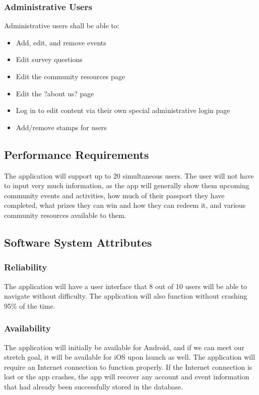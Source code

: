 \documentclass[draftclsnofoot, onecolumn, 10pt, compsoc]{IEEEtran}
\begin{document}
			\subsubsection{Administrative Users}
				Administrative users shall be able to:
				\begin{itemize}
					\item Add, edit, and remove events
					\item Edit survey questions
					\item Edit the community resources page
					\item Edit the ?about us? page
					\item Log in to edit content via their own special administrative login page
					\item Add/remove stamps for users
				\end{itemize}
		
		\subsection{Performance Requirements}
			The application will support up to 20 simultaneous users. The user will not have to input very much information, as the app will generally show them upcoming community events and activities, how much of their passport they have completed, what prizes they can win and how they can redeem it, and various community resources available to them.
		
		\subsection{Software System Attributes}
			\subsubsection{Reliability}
				The application will have a user interface that 8 out of 10 users will be able to navigate without difficulty. The application will also function without crashing 95\% of the time.
			
			\subsubsection{Availability}
				The application will initially be available for Android, and if we can meet our stretch goal, it will be available for iOS upon launch as well. The application will require an Internet connection to function properly. If the Internet connection is lost or the app crashes, the app will recover any account and event information that had already been successfully stored in the database.
			
\end{document}
